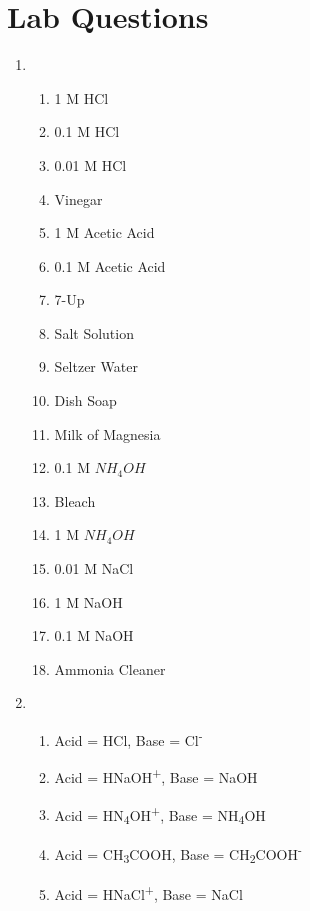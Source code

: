 \documentclass{article}
\begin{document}
\section{Lab Questions}
	\begin{enumerate}
		\item 
			\begin{enumerate}
				\item 1 M HCl
				\item 0.1 M HCl
				\item 0.01 M HCl
				\item Vinegar
				\item 1 M Acetic Acid
				\item 0.1 M Acetic Acid
				\item 7-Up
				\item Salt Solution
				\item Seltzer Water
				\item Dish Soap
				\item Milk of Magnesia
				\item 0.1 M \begin{math}NH_4OH\end{math}
				\item Bleach
				\item 1 M \begin{math}NH_4OH\end{math}
				\item 0.01 M NaCl
				\item 1 M NaOH
				\item 0.1 M NaOH
				\item Ammonia Cleaner
			\end{enumerate}
		\item 
			\begin{enumerate}
				\item Acid = HCl, Base = Cl\textsuperscript{-}
				\item Acid = HNaOH\textsuperscript{+}, Base = NaOH
				\item Acid =  HN\textsubscript{4}OH\textsuperscript{+}, Base = NH\textsubscript{4}OH
				\item Acid = CH\textsubscript{3}COOH, Base = CH\textsubscript{2}COOH\textsuperscript{-}
				\item Acid = HNaCl\textsuperscript{+}, Base = NaCl
			\end{enumerate}
	\end{enumerate}
\end{document}
